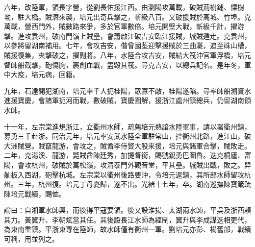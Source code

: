 \begin{pinyinscope}
六年，改陸軍，領長字營，從劉長佑援江西。由瀏陽攻萬載，破賊荊樹鋪、慄樹坳，駐大橋。賊潛來襲，培元出奇兵擊之，斬級八百。又破援賊於高城、竹埠。克萬載，營西門外，賊數路來爭，多於官軍數倍。培元開壁大戰，斬級千計，擢游擊。進攻袁州，破南門嶺上賊壘，會蕭啟江破吉安臨江援賊，城賊遁走。克袁州，以參將留湖南補用。七年，會攻吉安，偕曾國荃迎擊援賊於三曲灘，追至硃山槽，賊援復集，夾擊破之，擢副將。八年，水陸合攻吉安，賊結大筏沖官軍浮橋，培元督師船截擊，砲傷胸，裹創血戰，盡毀其筏。尋克吉安，以總兵記名。是年冬，軍中大疫，培元病，回籍。

九年，石達開犯湖南，培元率千人扼桂陽，眾寡不敵，桂陽遂陷。尋率師船溯資水進援寶慶，會諸軍扼河而戰，數破賊，寶慶圍解，援浙江處州鎮總兵，仍留湖南領水師。

十一年，左宗棠進規浙江，立衢州水師，疏薦培元熟諳水陸軍事，請以署衢州鎮，募勇三千赴浙。同治元年，培元率安武水陸全軍駐常山，控衢州北路，進江山，破大洲賊營。賊竄龍游，會攻之，賊酋李侍賢大股來援，培元與諸軍合擊，賊敗走。二年，克湯溪、龍游，斃賊酋陳廷秀，加提督銜，賜號銳勇巴圖魯。迭克桐廬、富陽，會攻杭州，破賊於萬松嶺，攻清泰門外觀音堂，平其壘。城賊出戰，敗之。舁舢板入西湖，砲擊杭城。左宗棠以衢州後路要沖，令培元返鎮，其所部水師留攻杭州。三年，杭州復。培元丁母憂歸，遂不出。光緒十七年，卒。湖南巡撫陳寶箴疏陳培元戰績，賜恤。

論曰：自湘軍水師興，而後得平寇要領。後又設淮揚、太湖兩水師，平吳及浙西賴其力。黃翼升、李朝斌當其任。其後設長江水師為經制，翼升與李成謀迭相更代，為東南重鎮。平浙東專在陸師，故水師僅有衢州一軍。劉培元亦彭、楊舊部，戰績可稱，用並列之。


\end{pinyinscope}